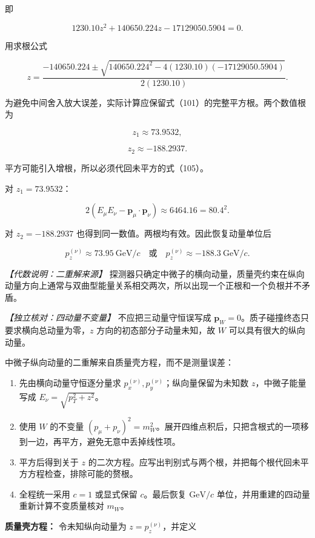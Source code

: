 \documentclass[12pt,a4paper,UTF8]{ctexart}
\newcommand{\tightlist}{\setlength{\itemsep}{0pt}\setlength{\parskip}{0pt}}
\begin{document}
即

\[1230.10z^2+140650.224z-17129050.5904=0. \tag{107a}\]

用求根公式

\[z=\frac{-140650.224\pm
\sqrt{140650.224^2-4(1230.10)(-17129050.5904)}}{2(1230.10)}. \tag{107b}\]

为避免中间舍入放大误差，实际计算应保留式（101）的完整平方根。两个数值根为

\[z_1\approx73.9532,\]

\[z_2\approx-188.2937. \tag{108}\]

平方可能引入增根，所以必须代回未平方的式（105）。

对 \(z_1=73.9532\)：

\[2(E_\mu E_\nu-\bm p_\mu\cdot\bm p_\nu)
\approx6464.16=80.4^2.\]

对 \(z_2=-188.2937\) 也得到同一数值。两根均有效。因此恢复动量单位后

\[\boxed{
p_z^{(\nu)}\approx73.95\ \mathrm{GeV}/c
\quad\text{或}\quad
p_z^{(\nu)}\approx-188.3\ \mathrm{GeV}/c
}. \tag{109}\]

\emph{【代数说明：二重解来源】}
探测器只确定中微子的横向动量，质量壳约束在纵向动量方向上通常与双曲型能量关系相交两次，所以出现一个正根和一个负根并不矛盾。

\emph{【独立核对：四动量不变量】} 不应把三动量守恒误写成
\(\bm p_W=0\)。质子碰撞终态只要求横向总动量为零，\(z\)
方向的初态部分子动量未知，故 \(W\) 可以具有很大的纵向动量。

中微子纵向动量的二重解来自质量壳方程，而不是测量误差：

\begin{enumerate}
\def\labelenumi{\arabic{enumi}.}
\tightlist
\item
  先由横向动量守恒逐分量求
  \(p_x^{(\nu)},p_y^{(\nu)}\)；纵向量保留为未知数 \(z\)，中微子能量写成
  \(E_\nu=\sqrt{p_T^2+z^2}\)。
\item
  使用 \(W\) 的不变量
  \((p_\mu+p_\nu)^2=m_W^2\)。展开四维点积后，只把含根式的一项移到一边，再平方，避免无意中丢掉线性项。
\item
  平方后得到关于 \(z\)
  的二次方程。应写出判别式与两个根，并把每个根代回未平方方程检查，排除可能的赘根。
\item
  全程统一采用 \(c=1\) 或显式保留 \(c\)。最后恢复 \(\mathrm{GeV}/c\)
  单位，并用重建的四动量重新计算不变质量核对 \(m_W\)。
\end{enumerate}

\textbf{质量壳方程：} 令未知纵向动量为 \(z=p_z^{(\nu)}\)，并定义
\end{document}
